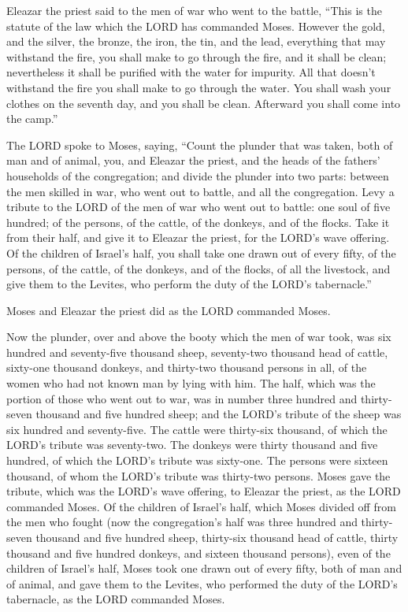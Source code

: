  Eleazar the priest said to the men of war who went to the
battle, ``This is the statute of the law which the LORD has commanded
Moses.  However the gold, and the silver, the bronze, the
iron, the tin, and the lead,  everything that may withstand
the fire, you shall make to go through the fire, and it shall be clean;
nevertheless it shall be purified with the water for impurity. All that
doesn't withstand the fire you shall make to go through the water.
 You shall wash your clothes on the seventh day, and you
shall be clean. Afterward you shall come into the camp.''

 The LORD spoke to Moses, saying,  ``Count the
plunder that was taken, both of man and of animal, you, and Eleazar the
priest, and the heads of the fathers' households of the congregation;
 and divide the plunder into two parts: between the men
skilled in war, who went out to battle, and all the congregation.
 Levy a tribute to the LORD of the men of war who went out
to battle: one soul of five hundred; of the persons, of the cattle, of
the donkeys, and of the flocks.  Take it from their half,
and give it to Eleazar the priest, for the LORD's wave offering.
 Of the children of Israel's half, you shall take one drawn
out of every fifty, of the persons, of the cattle, of the donkeys, and
of the flocks, of all the livestock, and give them to the Levites, who
perform the duty of the LORD's tabernacle.''

 Moses and Eleazar the priest did as the LORD commanded
Moses.

 Now the plunder, over and above the booty which the men of
war took, was six hundred and seventy-five thousand sheep, 
seventy-two thousand head of cattle,  sixty-one thousand
donkeys,  and thirty-two thousand persons in all, of the
women who had not known man by lying with him.  The half,
which was the portion of those who went out to war, was in number three
hundred and thirty-seven thousand and five hundred sheep; 
and the LORD's tribute of the sheep was six hundred and seventy-five.
 The cattle were thirty-six thousand, of which the LORD's
tribute was seventy-two.  The donkeys were thirty thousand
and five hundred, of which the LORD's tribute was sixty-one.
 The persons were sixteen thousand, of whom the LORD's
tribute was thirty-two persons.  Moses gave the tribute,
which was the LORD's wave offering, to Eleazar the priest, as the LORD
commanded Moses.  Of the children of Israel's half, which
Moses divided off from the men who fought  (now the
congregation's half was three hundred and thirty-seven thousand and five
hundred sheep,  thirty-six thousand head of cattle,
 thirty thousand and five hundred donkeys, 
and sixteen thousand persons),  even of the children of
Israel's half, Moses took one drawn out of every fifty, both of man and
of animal, and gave them to the Levites, who performed the duty of the
LORD's tabernacle, as the LORD commanded Moses.

